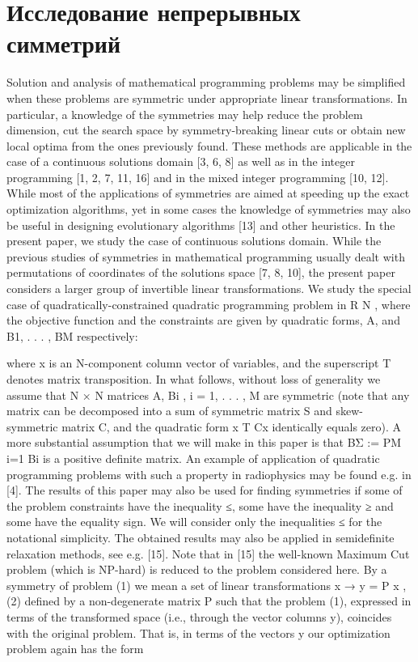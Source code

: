 \section{Исследование непрерывных симметрий}

Solution and analysis of mathematical programming problems may be simplified when these problems are symmetric under appropriate linear transformations. In particular, a knowledge of the symmetries may help reduce the problem
dimension, cut the search space by symmetry-breaking linear cuts or obtain new
local optima from the ones previously found. These methods are applicable in
the case of a continuous solutions domain [3, 6, 8] as well as in the integer programming [1, 2, 7, 11, 16] and in the mixed integer programming [10, 12]. While
most of the applications of symmetries are aimed at speeding up the exact optimization algorithms, yet in some cases the knowledge of symmetries may also
be useful in designing evolutionary algorithms [13] and other heuristics.
In the present paper, we study the case of continuous solutions domain. While
the previous studies of symmetries in mathematical programming usually dealt
with permutations of coordinates of the solutions space [7, 8, 10], the present
paper considers a larger group of invertible linear transformations. We study the
special case of quadratically-constrained quadratic programming problem in R
N ,
where the objective function and the constraints are given by quadratic forms,
A, and B1, . . . , BM respectively:


where x is an N-component column vector of variables, and the superscript T denotes matrix transposition. In what follows, without loss of generality we assume
that N × N matrices A, Bi
, i = 1, . . . , M are symmetric (note that any matrix
can be decomposed into a sum of symmetric matrix S and skew-symmetric matrix C, and the quadratic form x
T Cx identically equals zero). A more substantial
assumption that we will make in this paper is that BΣ := PM
i=1 Bi
is a positive
definite matrix. An example of application of quadratic programming problems
with such a property in radiophysics may be found e.g. in [4].
The results of this paper may also be used for finding symmetries if some
of the problem constraints have the inequality ≤, some have the inequality ≥
and some have the equality sign. We will consider only the inequalities ≤ for the
notational simplicity. The obtained results may also be applied in semidefinite
relaxation methods, see e.g. [15]. Note that in [15] the well-known Maximum
Cut problem (which is NP-hard) is reduced to the problem considered here.
By a symmetry of problem (1) we mean a set of linear transformations
x → y = P x , (2)
defined by a non-degenerate matrix P such that the problem (1), expressed in
terms of the transformed space (i.e., through the vector columns y), coincides
with the original problem. That is, in terms of the vectors y our optimization
problem again has the form


